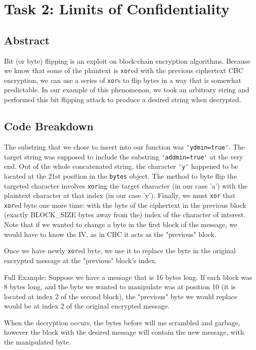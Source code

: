 \documentclass[11pt]{article}
\begin{document}
\section*{Task 2: Limits of Confidentiality}
\subsection*{Abstract}

Bit (or byte) flipping is an exploit on block-chain encryption algorithms. Because we know that some of the plaintext is \verb|xor|ed with the previous ciphertext CBC encryption, we can use a series of \verb|xor|s to flip bytes in a way that is somewhat predictable. In our example of this phenomenon, we took an arbitrary string and performed this bit flipping attack to produce a desired string when decrypted.

\subsection*{Code Breakdown}

The substring that we chose to insert into our function was \verb|'ydmin=true'|. The target string was supposed to include the substring \verb|'addmin=true'| at the very end. Out of the whole concatenated string, the character \verb|'y'| happened to be located at the 21st position in the \verb|bytes| object. The method to byte flip the targeted character involves \verb|xor|ing the target character (in our case 'a') with the plaintext character at that index (in our case 'y'). Finally, we must \verb|xor| that \verb|xor|ed byte one more time: with the byte of the ciphertext in the previous block (exactly BLOCK\_SIZE bytes away from the) index of the character of interest. Note that if we wanted to change a byte in the first block of the message, we would have to know the IV, as in CBC it acts as the "previous" block.

Once we have newly \verb|xor|ed byte, we use it to replace the byte in the original encrypted message at the "previous" block's index.

Full Example: Suppose we have a message that is 16 bytes long. If each block was 8 bytes long, and the byte we wanted to manipulate was at position 10 (it is located at index 2 of the second block), the "previous" byte we would replace would be at index 2 of the original encrypted message.

When the decryption occurs, the bytes before will me scrambled and garbage, however the block with the desired message will contain the new message, with the manipulated byte.
\end{document}

